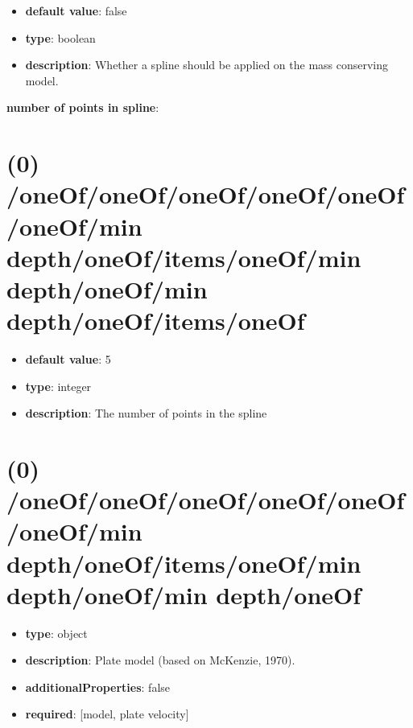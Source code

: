 \begin{itemize}[leftmargin=0em]\item {\bf default value}: false
\item {\bf type}: boolean
\item {\bf description}: Whether a spline should be applied on the mass conserving model.
\end{itemize}\item {\bf number of points in spline}: \section{(0) /oneOf/oneOf/oneOf/oneOf/oneOf/oneOf/min depth/oneOf/items/oneOf/min depth/oneOf/min depth/oneOf/items/oneOf}
\begin{itemize}[leftmargin=0em]\item {\bf default value}: 5
\item {\bf type}: integer
\item {\bf description}: The number of points in the spline
\end{itemize}\section{(0) /oneOf/oneOf/oneOf/oneOf/oneOf/oneOf/min depth/oneOf/items/oneOf/min depth/oneOf/min depth/oneOf}
\begin{itemize}[leftmargin=0em]\item {\bf type}: object
\item {\bf description}: Plate model (based on McKenzie, 1970).
\item {\bf additionalProperties}: false
\item {\bf required}: [model, plate velocity]\end{itemize}
